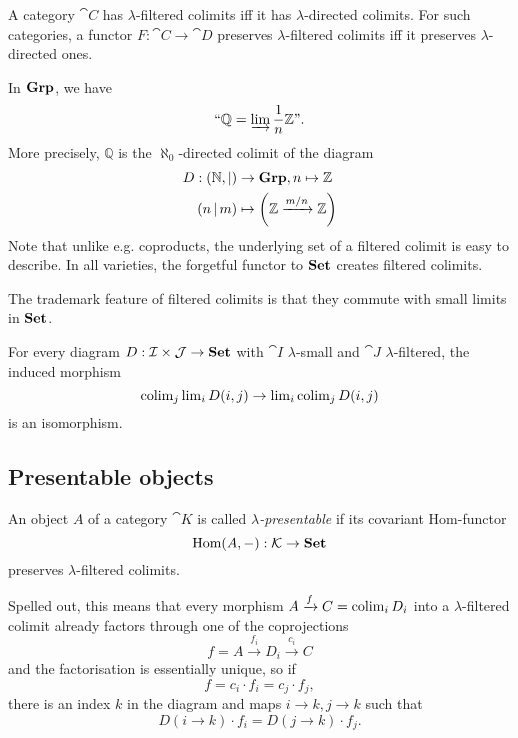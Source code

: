 \begin{Proposition}A category $\cat C$ has $\lambda$-filtered colimits iff it has $\lambda$-directed colimits. For such categories, a functor $F : \cat C \to \cat D$ preserves $\lambda$-filtered colimits iff it preserves $\lambda$-directed ones.
\end{Proposition}

\begin{Example}\label{ex:Q}
In $\mathbf{Grp}$, we have 
\[ \text{``}\mathbb Q = \varinjlim \frac 1 n \mathbb Z\text{''}. \]
More precisely, $\mathbb Q$ is the $\aleph_0$-directed colimit of the diagram
\begin{align*}
 D : (\mathbb N, |) &\to \mathbf{Grp}, n \mapsto \mathbb Z \\
 (n\, | \,m) &\mapsto \left(\mathbb Z \xrightarrow{m/n} \mathbb Z\right)
\end{align*}
Note that unlike e.g. coproducts, the underlying set of a filtered colimit is easy to describe. In all varieties, the forgetful functor to $\mathbf{Set}$ creates filtered colimits.
\end{Example}

The trademark feature of filtered colimits is that they commute with small limits in $\mathbf{Set}$.

\begin{Lemma}\label{prop:smallvsfiltered}
For every diagram $D : \mathcal{I} \times \mathcal{J} \to \mathbf{Set}$ with $\cat I$ $\lambda$-small and $\cat J$ $\lambda$-filtered, the induced morphism
\[ \operatorname{colim}_j \operatorname{lim}_i D(i,j) \to \operatorname{lim}_i \operatorname{colim}_j D(i,j) \]
is an isomorphism.
\end{Lemma}

\subsection{Presentable objects}
\begin{Definition}\label{def:presentableobject}
An object $A$ of a category $\cat K$ is called \emph{$\lambda$-presentable} if its covariant Hom-functor 
\[ \textrm{Hom}(A,-) : \mathcal{K} \to \mathbf{Set} \]
preserves $\lambda$-filtered colimits.
\end{Definition}
Spelled out, this means that every morphism $A \xrightarrow{f} C = \operatorname{colim}_i D_i$ into a $\lambda$-filtered colimit already factors through one of the coprojections
\[ f = A \xrightarrow{f_i} D_i \xrightarrow{c_i} C \]
and the factorisation is essentially unique, so if \[ f = c_i\cdot f_i = c_j \cdot f_j, \]
there is an index $k$ in the diagram and maps $i \to k, j \to k$ such that
\[ D(i \to k)\cdot f_i = D(j \to k) \cdot f_j. \]

